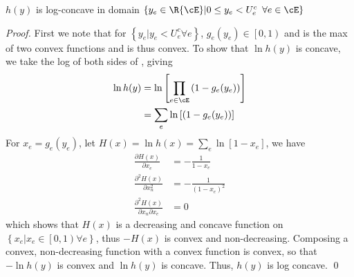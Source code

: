 \begin{lemma}
$h(y)$ is log-concave in domain $\left\{ y_e \in \R{\cE} | 0 \leq y_e < U^c_e \hspace{5px} \forall e \in \cE \right\}$
\end{lemma}
\begin{proof}
  First we note that for $\left\{ y_e | y_e < U^c_e \forall e \right\}$,  $g_e(y_e) \in \left[ 0, 1\right)$ and is the max of two convex functions and is thus convex. To show that $\ln h(y)$ is concave, we  take the log of both sides of , giving
\begin{align*}
\ln  h(y) & = \ln \left[ \prod_{e \in \cE} \left( 1 - g_e(y_e) \right) \right] \\
&= \sum_e \ln \left[ \left( 1 - g_e(y_e) \right)\right]
\end{align*}
For $x_e = g_e(y_e)$, let $H(x) = \ln h(x) = \sum_e \ln \left[ 1- x_e \right]$, we have
\begin{align*}
\frac{\partial H(x)}{\partial x_e} &=  -\frac{1}{1-x_e}  \\
\frac{\partial^2 H(x)}{\partial x_n^2} &=  - \frac{1}{(1-x_e)^2} \\
\frac{\partial^2 H(x)}{\partial x_n \partial x_e} &=  0 
\end{align*}
which shows that $H(x)$ is a decreasing and concave function on $\left\{x_e | x_e \in \left[0,1\right) \forall e \right\}$, thus $-H(x)$ is convex and non-decreasing.  Composing a convex, non-decreasing function with a convex function is convex, so that $-\ln h(y)$ is convex and $\ln h(y)$ is concave.  Thus, $h(y)$ is log concave. \qed
\end{proof}


